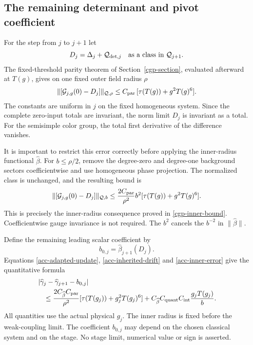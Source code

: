 \subsection{The remaining determinant and pivot coefficient}
\label{acc-leading-section}

For the step from $j$ to $j+1$ let
\begin{equation}
                 D_j=\Delta_j+\mathcal Q_{{\rm det},j}
                    \quad\hbox{as a class in }\mathcal Q_{j+1}.
 \label{acc-leading-definition}
\end{equation}
The fixed-threshold parity theorem of
Section~\ref{cgp-section}, evaluated afterward at $T(g)$,
gives on one fixed outer field radius $\rho$
\begin{equation}
 \|[\mathcal G_{j,g}(0)-D_j]\|_{\mathcal Q,\rho}
               \le C_{\rm par}\,[\tau(T(g))+g^2T(g)^6].
 \label{acc-outer-error}
\end{equation}
The constants are uniform in $j$ on the fixed homogeneous
system. Since the complete zero-input totals are invariant,
the norm limit $D_j$ is invariant as a total. For the
semisimple color group, the total first derivative of
the difference vanishes.

It is important to restrict this error correctly before
applying the inner-radius functional $\widehat\beta$.
For $b\le\rho/2$, remove the degree-zero and degree-one
background sectors coefficientwise and use homogeneous
phase projection. The normalized class is unchanged, and
the resulting bound is
\begin{equation}
 \|[\mathcal G_{j,g}(0)-D_j]\|_{\mathcal Q,b}
 \le \frac{2C_{\rm par}}{\rho^2}b^2
                     [\tau(T(g))+g^2T(g)^6].
 \label{acc-inner-error}
\end{equation}
This is precisely the inner-radius consequence proved in
\eqref{cgp-inner-bound}. Coefficientwise gauge invariance
is not required. The $b^2$ cancels the $b^{-2}$ in
$\|\widehat\beta\|$.

Define the remaining leading scalar coefficient by
\begin{equation}
                         b_{0,j}
                     =\widehat\beta_{j+1}(D_j).
 \label{acc-leading-coefficient}
\end{equation}
Equations \eqref{acc-adapted-update},
\eqref{acc-inherited-drift} and \eqref{acc-inner-error}
give the quantitative formula
\begin{align}
 &\left|
 \widehat\gamma_j-\widehat\gamma_{j+1}-b_{0,j}
 \right| \notag\\
 &\quad\le
 \frac{2C_{\widehat\beta}C_{\rm par}}{\rho^2}
                    [\tau(T(g_j))+g_j^2T(g_j)^6]
 +C_{\widehat\beta}C_{\rm quant}C_{\rm int}
                                      \frac{g_jT(g_j)}b.
 \label{acc-leading-drift}
\end{align}
All quantities use the actual physical $g_j$.
The inner radius is fixed before the weak-coupling limit.
The coefficient $b_{0,j}$ may depend on the chosen
classical system and on the stage. No stage limit,
numerical value or sign is asserted.

